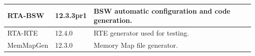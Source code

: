 \begin{longtable}{|l|l|l|}
\begin{minipage}{0.14\linewidth}\raggedright\vspace{.75ex}RTA-BSW\vspace{.75ex}\end{minipage} & \begin{minipage}{0.14\linewidth}\raggedright\vspace{.75ex}12.3.3pr1\vspace{.75ex}\end{minipage} & \begin{minipage}{0.64\linewidth}\raggedright\vspace{.75ex}BSW automatic configuration and code generation.\vspace{.75ex}\end{minipage}\\\hline
\begin{minipage}{0.14\linewidth}\raggedright\vspace{.75ex}RTA-RTE\vspace{.75ex}\end{minipage} & \begin{minipage}{0.14\linewidth}\raggedright\vspace{.75ex}12.4.0\vspace{.75ex}\end{minipage} & \begin{minipage}{0.64\linewidth}\raggedright\vspace{.75ex}RTE generator used for testing.\vspace{.75ex}\end{minipage}\\\hline
\begin{minipage}{0.14\linewidth}\raggedright\vspace{.75ex}MemMapGen\vspace{.75ex}\end{minipage} & \begin{minipage}{0.14\linewidth}\raggedright\vspace{.75ex}12.3.0\vspace{.75ex}\end{minipage} & \begin{minipage}{0.64\linewidth}\raggedright\vspace{.75ex}Memory Map file generator.\vspace{.75ex}\end{minipage}\\\hline

\end{longtable}
